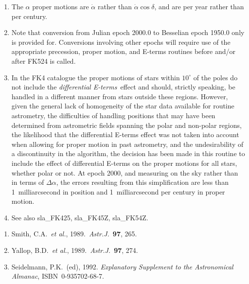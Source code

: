 {
 \begin{enumerate}
  \item The $\alpha$ proper motions are $\dot{\alpha}$ rather than
        $\dot{\alpha}\cos\delta$, and are per year rather than per century.
  \item Note that conversion from Julian epoch 2000.0 to Besselian
        epoch 1950.0 only is provided for.  Conversions involving
        other epochs will require use of the appropriate precession,
        proper motion, and E-terms routines before and/or after
        FK524 is called.
  \item In the FK4 catalogue the proper motions of stars within
        $10^{\circ}$ of the poles do not include the {\it differential
        E-terms}\, effect and should, strictly speaking, be handled
        in a different manner from stars outside these regions.
        However, given the general lack of homogeneity of the star
        data available for routine astrometry, the difficulties of
        handling positions that may have been determined from
        astrometric fields spanning the polar and non-polar regions,
        the likelihood that the differential E-terms effect was not
        taken into account when allowing for proper motion in past
        astrometry, and the undesirability of a discontinuity in
        the algorithm, the decision has been made in this routine to
        include the effect of differential E-terms on the proper
        motions for all stars, whether polar or not.  At epoch 2000,
        and measuring on the sky rather than in terms of $\Delta\alpha$,
        the errors resulting from this simplification are less than
        1~milliarcsecond in position and 1~milliarcsecond per
        century in proper motion.
  \item See also sla\_FK425, sla\_FK45Z, sla\_FK54Z.
 \end{enumerate}
}
{
 \begin{enumerate}
  \item Smith, C.A.\ {\it et al.}, 1989.\  {\it Astr.J.}\ {\bf 97}, 265.
  \item Yallop, B.D.\ {\it et al.}, 1989.\ {\it Astr.J.}\ {\bf 97}, 274.
  \item Seidelmann, P.K.\ (ed), 1992.  {\it Explanatory
        Supplement to the Astronomical Almanac}, ISBN~0-935702-68-7.
 \end{enumerate}
}
{
}
